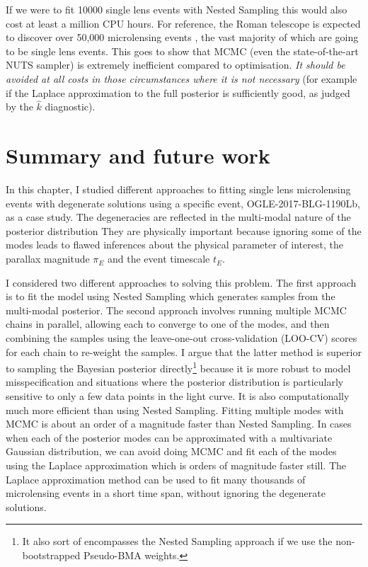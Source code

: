 \documentclass[12pt,dvipsnames]{report}
\begin{document}
If we were to fit 10000 single lens events with Nested Sampling this would also cost 
at least a million CPU hours. For reference, the Roman telescope is expected to 
discover over 50,000 microlensing events \citep{2020AJ....160..123J}, the vast majority 
of which are going to be single lens events.
This goes to show that MCMC (even the state-of-the-art
NUTS sampler) is extremely inefficient compared to optimisation.
\emph{It should be avoided 
at all costs in those circumstances where it is not necessary} (for example if 
the Laplace approximation to the full posterior is sufficiently good, as judged by the 
$\hat k$ diagnostic).

\section{Summary and future work}
\label{sec:conclusions_single_lens}
In this chapter, I studied different approaches to fitting single lens microlensing 
events with degenerate solutions using a specific event, OGLE-2017-BLG-1190Lb, as a case study.  
The degeneracies are reflected in the multi-modal nature of the posterior distribution
They are physically important
because ignoring some of the modes leads to flawed inferences about the physical parameter 
of interest, the parallax magnitude $\pi_E$ and the event timescale $t_E$.

I considered two  different approaches to solving this problem. The first approach is to fit 
the model using Nested Sampling which generates samples from the multi-modal posterior.
The second approach involves running multiple MCMC chains in parallel, allowing each to converge 
to one of the modes, and then combining the samples using the leave-one-out cross-validation 
(LOO-CV) scores for each chain to re-weight the samples. 
I argue that the latter method is superior to sampling the Bayesian posterior directly\footnote{
    It also sort of encompasses the Nested Sampling approach if we use the 
    non-bootstrapped Pseudo-BMA weights.
} because it is more robust to model misspecification and situations where the posterior 
distribution is particularly sensitive to only a few data points in the light curve.
It is also computationally much more efficient than using Nested Sampling.
Fitting multiple modes with MCMC is about an order of a magnitude faster 
than Nested Sampling. In cases when each of the posterior modes can be approximated 
with a multivariate Gaussian distribution, we can avoid doing MCMC and fit each of the modes
using the Laplace approximation which is orders of magnitude faster still.
The Laplace approximation method can be used to fit many thousands of 
microlensing events in a short time span, without ignoring the degenerate solutions. 
\end{document}

